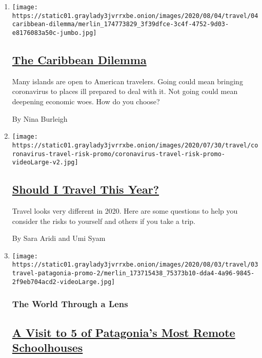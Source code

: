 \begin{enumerate}
\def\labelenumi{\arabic{enumi}.}
\item
  \texttt{[image: https://static01.graylady3jvrrxbe.onion/images/2020/08/04/travel/04caribbean-dilemma/merlin\_174773829\_3f39dfce-3c4f-4752-9d03-e8176083a50c-jumbo.jpg]}

  \hypertarget{the-caribbean-dilemma}{%
  \subsection{\texorpdfstring{\href{/2020/08/04/travel/coronavirus-caribbean-vacations.html}{The
  Caribbean
  Dilemma}}{The Caribbean Dilemma}}\label{the-caribbean-dilemma}}

  Many islands are open to American travelers. Going could mean bringing
  coronavirus to places ill prepared to deal with it. Not going could
  mean deepening economic woes. How do you choose?

  By Nina Burleigh
\item
  \texttt{[image: https://static01.graylady3jvrrxbe.onion/images/2020/07/30/travel/coronavirus-travel-risk-promo/coronavirus-travel-risk-promo-videoLarge-v2.jpg]}

  \hypertarget{should-i-travel-this-year}{%
  \subsection{\texorpdfstring{\href{/interactive/2020/07/31/travel/coronavirus-travel-risk.html}{Should
  I Travel This
  Year?}}{Should I Travel This Year?}}\label{should-i-travel-this-year}}

  Travel looks very different in 2020. Here are some questions to help
  you consider the risks to yourself and others if you take a trip.

  By Sara Aridi and Umi Syam
\item
  \texttt{[image: https://static01.graylady3jvrrxbe.onion/images/2020/08/03/travel/03travel-patagonia-promo-2/merlin\_173715438\_75373b10-dda4-4a96-9845-2f9eb704acd2-videoLarge.jpg]}

  \hypertarget{the-world-through-a-lens}{%
  \subsubsection{The World Through a
  Lens}\label{the-world-through-a-lens}}

  \hypertarget{a-visit-to-5-of-patagonias-most-remote-schoolhouses}{%
  \subsection{\texorpdfstring{\href{/2020/08/03/travel/remote-schools-patagonia.html}{A
  Visit to 5 of Patagonia's Most Remote
  Schoolhouses}}{A Visit to 5 of Patagonia's Most Remote Schoolhouses}}\label{a-visit-to-5-of-patagonias-most-remote-schoolhouses}}


\end{enumerate}
